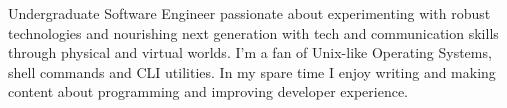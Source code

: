 

\begin{cvparagraph}

    Undergraduate Software Engineer passionate about experimenting with robust technologies and nourishing next generation with tech and communication skills through physical and virtual worlds. I'm a fan of Unix-like Operating Systems, shell commands and CLI utilities. In my spare time I enjoy writing and making content about programming and improving developer experience.
\end{cvparagraph}
